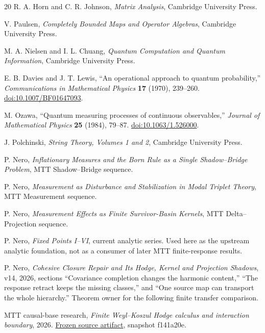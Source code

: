 \documentclass[11pt]{article}
\begin{document}
\begin{thebibliography}{20}
R. A. Horn and C. R. Johnson,
\emph{Matrix Analysis},
Cambridge University Press.

V. Paulsen,
\emph{Completely Bounded Maps and Operator Algebras},
Cambridge University Press.

M. A. Nielsen and I. L. Chuang,
\emph{Quantum Computation and Quantum Information},
Cambridge University Press.

E. B. Davies and J. T. Lewis,
``An operational approach to quantum probability,''
\emph{Communications in Mathematical Physics} \textbf{17} (1970), 239--260.
\href{https://doi.org/10.1007/BF01647093}{doi:10.1007/BF01647093}.

M. Ozawa,
``Quantum measuring processes of continuous observables,''
\emph{Journal of Mathematical Physics} \textbf{25} (1984), 79--87.
\href{https://doi.org/10.1063/1.526000}{doi:10.1063/1.526000}.

J. Polchinski,
\emph{String Theory, Volumes 1 and 2},
Cambridge University Press.

P. Nero,
\emph{Inflationary Measures and the Born Rule as a Single Shadow--Bridge Problem},
MTT Shadow--Bridge sequence.

P. Nero,
\emph{Measurement as Disturbance and Stabilization in Modal Triplet Theory},
MTT Measurement sequence.

P. Nero,
\emph{Measurement Effects as Finite Survivor-Basin Kernels},
MTT Delta--Projection sequence.

P. Nero, \emph{Fixed Points I--VI}, current analytic series.
Used here as the upstream analytic foundation, not as a consumer of later
MTT finite-response results.

P. Nero, \emph{Cohesive Closure Repair and Its Hodge, Kernel and Projection
Shadows}, v14, 2026, sections ``Covariance completion changes the harmonic
content,'' ``The response retract keeps the missing classes,'' and
``One source map can transport the whole hierarchy.''
Theorem owner for the following finite transfer comparison.

MTT causal-base research, \emph{Finite Weyl--Koszul Hodge calculus and interaction boundary}, 2026.
\href{https://github.com/PeterNero/mtt-results-repro/blob/f141a20ea23c5c3ff19cc2161c0e226e29ade8a7/release/results/causal_base_selected_finite_weyl_koszul_hodge_and_interaction_cutset_packet/artifact.json}{Frozen source artifact}, snapshot f141a20e.


\end{thebibliography}
\end{document}
